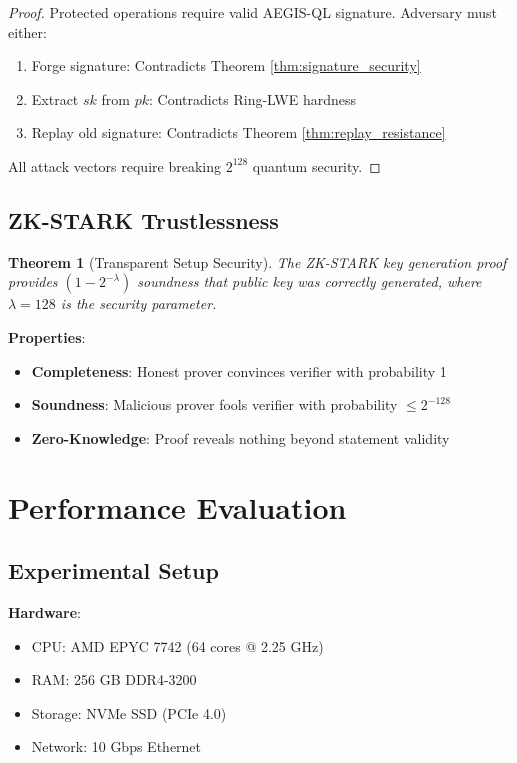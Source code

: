 \documentclass[11pt,a4paper]{article}
\newtheorem{theorem}{Theorem}[section]
\begin{document}
\begin{proof}
Protected operations require valid AEGIS-QL signature. Adversary must either:
\begin{enumerate}
    \item Forge signature: Contradicts Theorem \ref{thm:signature_security}
    \item Extract $sk$ from $pk$: Contradicts Ring-LWE hardness
    \item Replay old signature: Contradicts Theorem \ref{thm:replay_resistance}
\end{enumerate}
All attack vectors require breaking $2^{128}$ quantum security.
\end{proof}

\subsection{ZK-STARK Trustlessness}

\begin{theorem}[Transparent Setup Security]
\label{thm:stark_security}
The ZK-STARK key generation proof provides $(1 - 2^{-\lambda})$ soundness that public key was correctly generated, where $\lambda = 128$ is the security parameter.
\end{theorem}

\textbf{Properties}:
\begin{itemize}
    \item \textbf{Completeness}: Honest prover convinces verifier with probability 1
    \item \textbf{Soundness}: Malicious prover fools verifier with probability $\leq 2^{-128}$
    \item \textbf{Zero-Knowledge}: Proof reveals nothing beyond statement validity
\end{itemize}

\section{Performance Evaluation}

\subsection{Experimental Setup}

\textbf{Hardware}:
\begin{itemize}[leftmargin=*]
    \item CPU: AMD EPYC 7742 (64 cores @ 2.25 GHz)
    \item RAM: 256 GB DDR4-3200
    \item Storage: NVMe SSD (PCIe 4.0)
    \item Network: 10 Gbps Ethernet
\end{itemize}
\end{document}
